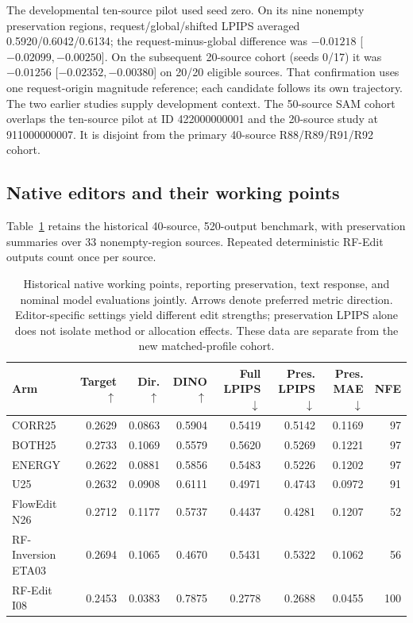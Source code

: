\documentclass[10pt,doubleanonymous]{ieeeconf}
\begin{document}
The developmental ten-source pilot used seed zero. On its nine nonempty preservation regions, request/global/shifted LPIPS averaged 0.5920/0.6042/0.6134; the request-minus-global difference was $-0.01218$ [$-0.02099,-0.00250$]. On the subsequent 20-source cohort (seeds 0/17) it was $-0.01256$ [$-0.02352,-0.00380$] on 20/20 eligible sources. That confirmation uses one request-origin magnitude reference; each candidate follows its own trajectory. The two earlier studies supply development context. The 50-source SAM cohort overlaps the ten-source pilot at ID 422000000001 and the 20-source study at 911000000007. It is disjoint from the primary 40-source R88/R89/R91/R92 cohort.

\subsection{Native editors and their working points}
Table~\ref{tab:native} retains the historical 40-source, 520-output benchmark, with preservation summaries over 33 nonempty-region sources. Repeated deterministic RF-Edit outputs count once per source.

\begin{table}[!t]
\centering\small
\caption{Historical native working points, reporting preservation, text response, and nominal model evaluations jointly. Arrows denote preferred metric direction. Editor-specific settings yield different edit strengths; preservation LPIPS alone does not isolate method or allocation effects. These data are separate from the new matched-profile cohort.}
\label{tab:native}
\begin{tabular}{lrrrrrrr}
\toprule
Arm & Target $\uparrow$ & Dir. $\uparrow$ & DINO $\uparrow$ & Full LPIPS $\downarrow$ & Pres. LPIPS $\downarrow$ & Pres. MAE $\downarrow$ & NFE\\
\midrule
CORR25 &0.2629&0.0863&0.5904&0.5419&0.5142&0.1169&97\\
BOTH25 &0.2733&0.1069&0.5579&0.5620&0.5269&0.1221&97\\
ENERGY &0.2622&0.0881&0.5856&0.5483&0.5226&0.1202&97\\
U25 &0.2632&0.0908&0.6111&0.4971&0.4743&0.0972&91\\
FlowEdit N26 &0.2712&0.1177&0.5737&0.4437&0.4281&0.1207&52\\
RF-Inversion ETA03 &0.2694&0.1065&0.4670&0.5431&0.5322&0.1062&56\\
RF-Edit I08 &0.2453&0.0383&0.7875&0.2778&0.2688&0.0455&100\\
\bottomrule
\end{tabular}
\end{table}
\end{document}
